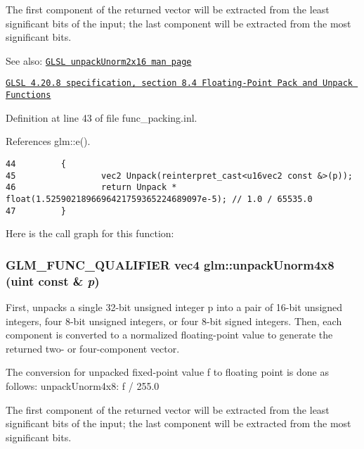 The first component of the returned vector will be extracted from the least significant bits of the input; the last component will be extracted from the most significant bits.

\begin{Desc}
\item[See also:]\href{http://www.opengl.org/sdk/docs/manglsl/xhtml/unpackUnorm2x16.xml}{\tt GLSL unpackUnorm2x16 man page} 

\href{http://www.opengl.org/registry/doc/GLSLangSpec.4.20.8.pdf}{\tt GLSL 4.20.8 specification, section 8.4 Floating-Point Pack and Unpack Functions} \end{Desc}


Definition at line 43 of file func\_\-packing.inl.

References glm::e().

\begin{Code}\begin{verbatim}44         {
45                 vec2 Unpack(reinterpret_cast<u16vec2 const &>(p));
46                 return Unpack * float(1.5259021896696421759365224689097e-5); // 1.0 / 65535.0
47         }
\end{verbatim}
\end{Code}




Here is the call graph for this function:\hypertarget{group__core__func__packing_g5d3c4d354b48a317935349dd62a8b8a5}{
\subsubsection[unpackUnorm4x8]{\setlength{\rightskip}{0pt plus 5cm}GLM\_\-FUNC\_\-QUALIFIER vec4 glm::unpackUnorm4x8 (uint const \& {\em p})}}
\label{group__core__func__packing_g5d3c4d354b48a317935349dd62a8b8a5}


First, unpacks a single 32-bit unsigned integer p into a pair of 16-bit unsigned integers, four 8-bit unsigned integers, or four 8-bit signed integers. Then, each component is converted to a normalized floating-point value to generate the returned two- or four-component vector.

The conversion for unpacked fixed-point value f to floating point is done as follows: unpackUnorm4x8: f / 255.0

The first component of the returned vector will be extracted from the least significant bits of the input; the last component will be extracted from the most significant bits.

